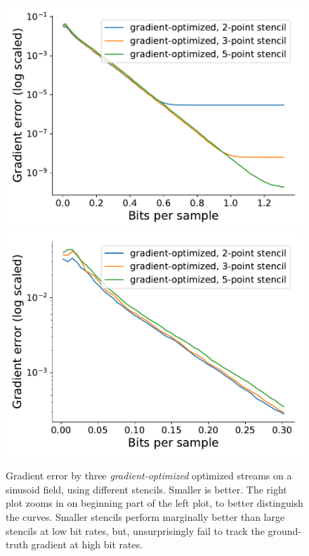 \begin{figure}
	\centering
	{\includegraphics[width=0.48\linewidth]{img/gradient-laplacian/sine-gradient-stencils-full.pdf}}
	{\includegraphics[width=0.48\linewidth]{img/gradient-laplacian/sine-gradient-stencils-cutoff.pdf}}
	\caption{Gradient error by three \emph{gradient-optimized} optimized streams on a sinusoid field,
	using different stencils. Smaller is better. The right plot zooms in on beginning part of the
	left plot, to better distinguish the curves. Smaller stencils perform marginally better than
	large stencils at low bit rates, but, unsurprisingly fail to track the ground-truth gradient at
	high bit rates.}
  \label{fig:gradient-error-comparison-stencils}
\end{figure}

